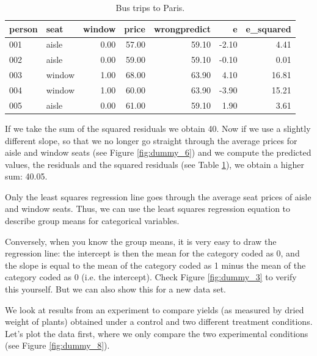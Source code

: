 \documentclass[]{book}\usepackage[]{graphicx}\usepackage[]{color}
\begin{document}
\begin{table}[ht]
\centering
\caption{Bus trips to Paris.} 
\label{tab:dummy_7}
\begin{tabular}{llrrrrr}
  \hline
person & seat & window & price & wrongpredict & e & e\_squared \\ 
  \hline
001 & aisle & 0.00 & 57.00 & 59.10 & -2.10 & 4.41 \\ 
  002 & aisle & 0.00 & 59.00 & 59.10 & -0.10 & 0.01 \\ 
  003 & window & 1.00 & 68.00 & 63.90 & 4.10 & 16.81 \\ 
  004 & window & 1.00 & 60.00 & 63.90 & -3.90 & 15.21 \\ 
  005 & aisle & 0.00 & 61.00 & 59.10 & 1.90 & 3.61 \\ 
   \hline
\end{tabular}
\end{table}


If we take the sum of the squared residuals we obtain 40. Now if we use a slightly different slope, so that we no longer go straight through the average prices for aisle and window seats (see Figure \ref{fig:dummy_6}) and we compute the predicted values, the residuals and the squared residuals (see Table \ref{tab:dummy_7}), we obtain a higher sum: 40.05. 

Only the least squares regression line goes through the average seat prices of aisle and window seats. Thus, we can use the least squares regression equation to describe group means for categorical variables. 

Conversely, when you know the group means, it is very easy to draw the regression line: the intercept is then the mean for the category coded as 0, and the slope is equal to the mean of the category coded as 1 minus the mean of the category coded as 0 (i.e. the intercept). Check Figure \ref{fig:dummy_3} to verify this yourself. But we can also show this for a new data set.


We look at results from an experiment to compare yields (as measured by dried weight of plants) obtained under a control and two different treatment conditions. Let's plot the data first, where we only compare the two experimental conditions (see Figure \ref{fig:dummy_8}).
\end{document}
